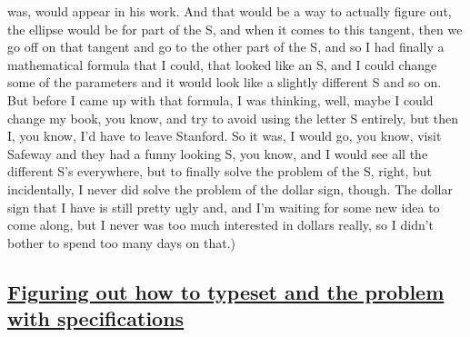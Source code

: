 \documentclass[]{article}
\begin{document}
was, would appear in his work. And that would be a way to actually
figure out, the ellipse would be for part of the S, and when it comes to
this tangent, then we go off on that tangent and go to the other part of
the S, and so I had finally a mathematical formula that I could, that
looked like an S, and I could change some of the parameters and it would
look like a slightly different S and so on. But before I came up with
that formula, I was thinking, well, maybe I could change my book, you
know, and try to avoid using the letter S entirely, but then I, you
know, I'd have to leave Stanford. So it was, I would go, you know, visit
Safeway and they had a funny looking S, you know, and I would see all
the different S's everywhere, but to finally solve the problem of the S,
right, but incidentally, I never did solve the problem of the dollar
sign, though. The dollar sign that I have is still pretty ugly and, and
I'm waiting for some new idea to come along, but I never was too much
interested in dollars really, so I didn't bother to spend too many days
on that.)

\subsection{\texorpdfstring{\href{http://webofstories.com/play/17115}{Figuring
out how to typeset and the problem with
specifications}}{Figuring out how to typeset and the problem with specifications}}\label{figuring-out-how-to-typeset-and-the-problem-with-specifications}
\end{document}
